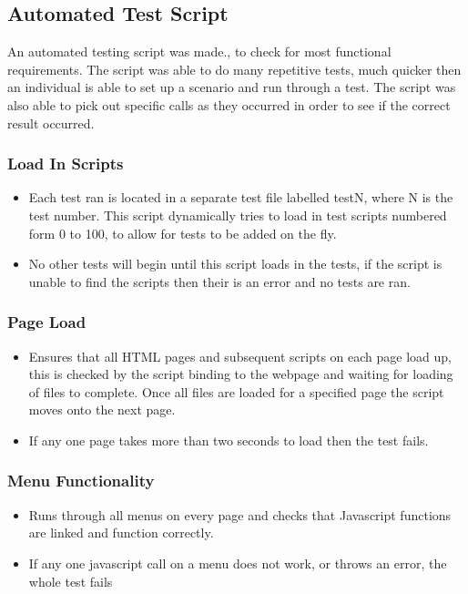 \documentclass{article}
\begin{document}
\subsection{Automated Test Script}
An automated testing script was made., to check for most functional requirements.
The script was able to do many repetitive tests, much quicker then an individual
is able to set up a scenario and run through a test. The script was also able to 
pick out specific calls as they occurred in order to see if the correct result occurred.

\subsubsection{Load In Scripts}
\begin{itemize}  
\item Each test ran is located in a separate test file labelled testN, where N is the test number.
	This script dynamically tries to load in test scripts numbered form 0 to 100, to allow for 
	tests to be added on the fly.
\item No other tests will begin until this script loads in the tests, if the script is unable to find the
	scripts then their is an error and no tests are ran.

\end{itemize}

\subsubsection{Page Load}
\begin{itemize}  
\item Ensures that all HTML pages and subsequent scripts on each page load up, this is
	checked by the script binding to the webpage and waiting for loading of files to 
	complete. Once all files are loaded for a specified page the script moves onto the
	next page.
\item If any one page takes more than two seconds to load then the test fails.
\end{itemize}

\subsubsection{Menu Functionality}
\begin{itemize}  
\item Runs through all menus on every page and checks that Javascript functions are 
	linked and function correctly.
\item If any one javascript call on a menu does not work, or throws an error, the whole 
	test fails
\end{itemize}
\end{document}
